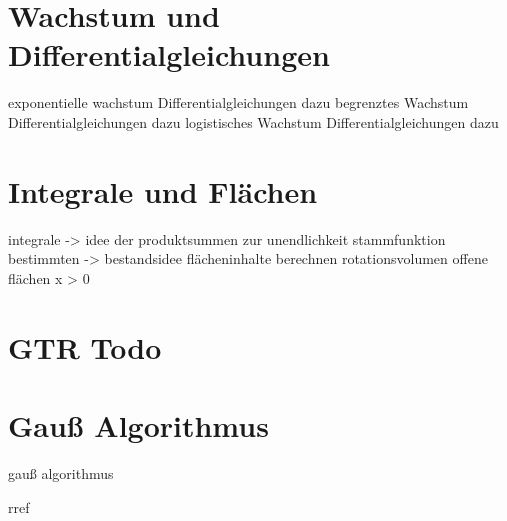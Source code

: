 \clearpage

\section{Wachstum und Differentialgleichungen}

exponentielle wachstum
Differentialgleichungen dazu
begrenztes Wachstum
Differentialgleichungen dazu
logistisches Wachstum
Differentialgleichungen dazu

\section{Integrale und Flächen}

integrale -> idee der produktsummen zur unendlichkeit
stammfunktion bestimmten -> bestandsidee
flächeninhalte berechnen
rotationsvolumen
offene flächen
x > 0

\section{GTR Todo}

\section{Gauß Algorithmus}

gauß algorithmus

rref
